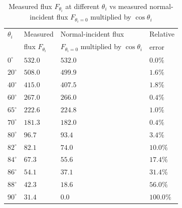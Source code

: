 \begin{table}[h]
    \centering
    \caption{Measured flux $F_{\theta_i}$ at different $\theta_i$ vs measured normal-incident flux $F_{\theta_i=0}$ multiplied by $\cos\theta_i$ }
    \label{tab:measured_flux_comparison}
    \begin{tabular}{llll}
        \hline
        \hline
        $\theta_i$ & Measured            & Normal-incident flux                          & Relative  \\
                   & flux $F_{\theta_i}$ & $F_{\theta_i=0}$ multiplied by $\cos\theta_i$ & error     \\
        \hline
        $0^\circ$  & $532.0$             & $532.0$                                       & $0.0\%$   \\
        \hline
        $20^\circ$ & $508.0$             & $499.9$                                       & $1.6\%$   \\
        \hline
        $40^\circ$ & $415.0$             & $407.5$                                       & $1.8\%$   \\
        \hline
        $60^\circ$ & $267.0$             & $266.0$                                       & $0.4\%$   \\
        \hline
        $65^\circ$ & $222.6$             & $224.8$                                       & $1.0\%$   \\
        \hline
        $70^\circ$ & $181.3$             & $182.0$                                       & $0.4\%$   \\
        \hline
        $80^\circ$ & $96.7$              & $93.4$                                        & $3.4\%$   \\
        \hline
        $82^\circ$ & $82.1$              & $74.0$                                        & $10.0\%$  \\
        \hline
        $84^\circ$ & $67.3$              & $55.6$                                        & $17.4\%$  \\
        \hline
        $86^\circ$ & $54.1$              & $37.1$                                        & $31.4\%$  \\
        \hline
        $88^\circ$ & $42.3$              & $18.6$                                        & $56.0\%$  \\
        \hline
        $90^\circ$ & $31.4$              & $0.0$                                         & $100.0\%$ \\
        \hline
        \hline
    \end{tabular}
\end{table}

